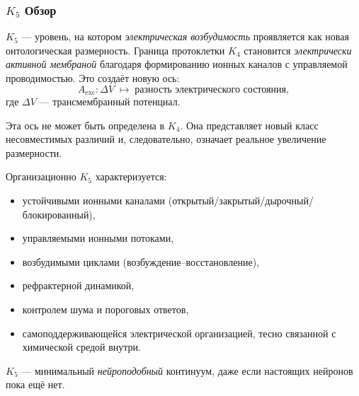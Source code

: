 

\subsubsection{\texorpdfstring{$K_5$}{K_5} Обзор}
\label{sec:k5-overview}

$K_5$ — уровень, на котором \emph{электрическая возбудимость} проявляется
как новая онтологическая размерность. Граница протоклетки $K_4$ становится
\emph{электрически активной мембраной} благодаря формированию ионных
каналов с управляемой проводимостью. Это создаёт новую ось:
\[
A_{\mathrm{exc}}: \Delta V \;\mapsto\; \text{разность электрического состояния},
\]
где $\Delta V$ — трансмембранный потенциал.

Эта ось не может быть определена в $K_4$. Она представляет новый класс
несовместимых различий и, следовательно, означает реальное увеличение
размерности.

Организационно $K_5$ характеризуется:
\begin{itemize}
    \item устойчивыми ионными каналами (открытый/закрытый/дырочный/блокированный),
    \item управляемыми ионными потоками,
    \item возбудимыми циклами (возбуждение–восстановление),
    \item рефрактерной динамикой,
    \item контролем шума и пороговых ответов,
    \item самоподдерживающейся электрической организацией, тесно
          связанной с химической средой внутри.
\end{itemize}

$K_5$ — минимальный \emph{нейроподобный} континуум, даже если
настоящих нейронов пока ещё нет.


